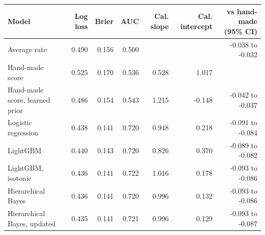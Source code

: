 \begin{tabular}{lrrrrrr}
\toprule
Model & Log loss & Brier & AUC & Cal. slope & Cal. intercept & vs hand-made (95\% CI) \\
\midrule
Average rate & 0.490 & 0.156 & 0.500 &  &  & -0.038 to -0.032 \\
Hand-made score & 0.525 & 0.170 & 0.536 & 0.528 & 1.017 &  \\
Hand-made score, learned prior & 0.486 & 0.154 & 0.543 & 1.215 & -0.148 & -0.042 to -0.037 \\
Logistic regression & 0.438 & 0.141 & 0.720 & 0.948 & 0.218 & -0.091 to -0.084 \\
LightGBM & 0.440 & 0.143 & 0.720 & 0.826 & 0.370 & -0.089 to -0.082 \\
LightGBM, isotonic & 0.436 & 0.141 & 0.722 & 1.016 & 0.178 & -0.093 to -0.086 \\
Hierarchical Bayes & 0.436 & 0.141 & 0.720 & 0.996 & 0.132 & -0.093 to -0.086 \\
Hierarchical Bayes, updated & 0.435 & 0.141 & 0.721 & 0.996 & 0.129 & -0.093 to -0.087 \\
\bottomrule
\end{tabular}

